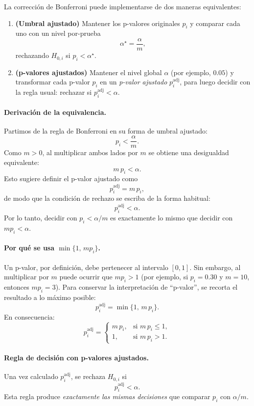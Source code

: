 La correcci\'on de Bonferroni puede implementarse de dos maneras equivalentes:

\begin{enumerate}
    \item \textbf{(Umbral ajustado)} Mantener los p-valores originales $p_i$ y comparar cada uno con un nivel por-prueba
    \[
    \alpha^\star=\frac{\alpha}{m},
    \]
    rechazando $H_{0,i}$ si $p_i<\alpha^\star$.

    \item \textbf{(p-valores ajustados)} Mantener el nivel global $\alpha$ (por ejemplo, $0.05$) y transformar cada p-valor $p_i$ en un \emph{p-valor ajustado} $p_i^{\mathrm{adj}}$, para luego decidir con la regla usual: rechazar si $p_i^{\mathrm{adj}}<\alpha$.
\end{enumerate}

\paragraph{Derivaci\'on de la equivalencia.}
Partimos de la regla de Bonferroni en su forma de umbral ajustado:
\[
p_i < \frac{\alpha}{m}.
\]
Como $m>0$, al multiplicar ambos lados por $m$ se obtiene una desigualdad equivalente:
\[
m\,p_i < \alpha.
\]
Esto sugiere definir el p-valor ajustado como
\[
p_i^{\mathrm{adj}} = m\,p_i,
\]
de modo que la condici\'on de rechazo se escriba de la forma habitual:
\[
p_i^{\mathrm{adj}} < \alpha.
\]
Por lo tanto, decidir con $p_i<\alpha/m$ es exactamente lo mismo que decidir con $m p_i<\alpha$.

\paragraph{Por qu\'e se usa $\min\{1,\,m p_i\}$.}
Un p-valor, por definici\'on, debe pertenecer al intervalo $[0,1]$. Sin embargo, al multiplicar por $m$ puede ocurrir que $m p_i>1$ (por ejemplo, si $p_i=0.30$ y $m=10$, entonces $m p_i=3$). Para conservar la interpretaci\'on de ``p-valor'', se recorta el resultado a lo m\'aximo posible:
\[
p_i^{\mathrm{adj}}=\min\{1,\,m\,p_i\}.
\]
En consecuencia:
\[
p_i^{\mathrm{adj}}=
\begin{cases}
m\,p_i, & \text{si } m\,p_i\le 1,\\[4pt]
1, & \text{si } m\,p_i>1.
\end{cases}
\]

\paragraph{Regla de decisi\'on con p-valores ajustados.}
Una vez calculado $p_i^{\mathrm{adj}}$, se rechaza $H_{0,i}$ si
\[
p_i^{\mathrm{adj}}<\alpha.
\]
Esta regla produce \emph{exactamente las mismas decisiones} que comparar $p_i$ con $\alpha/m$.

